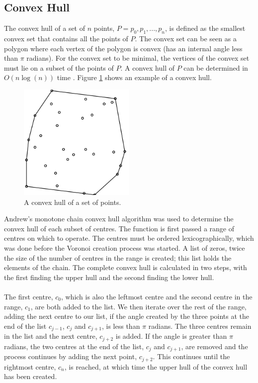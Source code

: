 \subsection{Convex Hull}
The convex hull of a set of $n$ points, $P = {p_0,p_1,...,p_n}$, is defined as the smallest convex set that contains all the points of $P$. The convex set can be seen as a polygon where each vertex of the polygon is convex (has an internal angle less than $\pi$ radians). For the convex set to be minimal, the vertices of the convex set must lie on a subset of the points of $P$. A convex hull of $P$ can be determined in $O(n\log(n))$ time \citep{eddy1977new}. Figure \ref{fig:convexhull} shows an example of a convex hull.
\begin{figure}[H]
\centering
\includegraphics[width=0.5\textwidth]{Images/convexhull.png}
\caption[]{A convex hull of a set of points\footnotemark.}
\label{fig:convexhull}
\end{figure}
Andrew's monotone chain convex hull algorithm \citep{andrew1979another} was used to determine the convex hull of each subset of centres. The function is first passed a range of centres on which to operate. The centres must be ordered lexicographically, which was done before the Voronoi creation process was started. A list of zeros, twice the size of the number of centres in the range is created; this list holds the elements of the chain. The complete convex hull is calculated in two steps, with the first finding the upper hull and the second finding the lower hull.
\\
\\
The first centre, $c_0$, which is also the leftmost centre and the second centre in the range, $c_1$, are both added to the list. We then iterate over the rest of the range, adding the next centre to our list, if the angle created by the three points at the end of the list $c_{j-1}$, $c_j$ and $c_{j+1}$, is less than $\pi$ radians. The three centres remain in the list and the next centre, $c_{j+2}$ is added. If the angle is greater than $\pi$ radians, the two centres at the end of the list, $c_j$ and $c_{j+1}$, are removed and the process continues by adding the next point, $c_{j+2}$. This continues until the rightmost centre, $c_n$, is reached, at which time the upper hull of the convex hull has been created.
